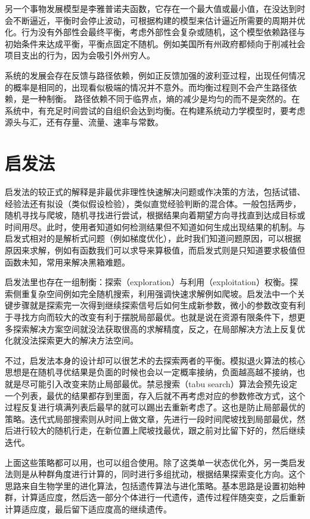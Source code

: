 \documentclass[]{tufte-book}
\begin{document}
另一个事物发展模型是李雅普诺夫函数，它存在一个最大值或最小值，在没达到时会不断逼近，平衡时会停止波动，可根据构建的模型来估计逼近所需要的周期并优化。行为没有外部性会最终平衡，考虑外部性会复杂或随机，这个模型依赖路径与初始条件来达成平衡，平衡点固定不随机。例如美国所有州政府都倾向于削减社会项目支出的行为，因为会吸引外州穷人。

系统的发展会存在反馈与路径依赖，例如正反馈加强的波利亚过程，出现任何情况的概率是相同的，出现看似极端的情况并不意外。而均衡过程则不会产生路径依赖，是一种制衡。 路径依赖不同于临界点，熵的减少是均匀的而不是突然的。在系统中，有充足时间尝试的自组织会达到均衡。在构建系统动力学模型时，要考虑源头与汇，还有存量、流量、速率与常数。

\hypertarget{ux542fux53d1ux6cd5}{%
\section{启发法}\label{ux542fux53d1ux6cd5}}

启发法的较正式的解释是非最优非理性快速解决问题或作决策的方法，包括试错、经验法还有拟设（类似假设检验），类似直觉经验判断的混合体。一般包括两步，随机寻找与爬坡，随机寻找进行尝试，根据结果向着期望方向寻找直到达成目标或时间用尽。此时，使用者知道如何检测结果但不知道如何生成出现结果的机制。与启发式相对的是解析式问题（例如梯度优化），此时我们知道问题原因，可以根据原因来求解，例如有函数我们可以求导来算极值，而启发式则是只知道要求极值但函数未知，常用来解决黑箱难题。

启发法里也存在一组制衡：探索（exploration）与利用（exploitation）权衡。探索侧重复杂空间例如完全随机搜索，利用强调快速求解例如爬坡。启发法中一个关键步骤就是探索完一次得到继续探索信号后如何生成新参数，微小的参数改变有利于寻找方向而较大的改变有利于摆脱局部最优。也就是说在资源有限条件下，想更多探索解决方案空间就没法获取很高的求解精度，反之，在局部解决方法上反复优化就没法探索更大的解决方法空间。

不过，启发法本身的设计却可以很艺术的去探索两者的平衡。模拟退火算法的核心思想是在随机寻优结果是负面的时候也会以一定概率接纳，负面越高越不接纳，也就是尽可能引入改变来防止局部最优。禁忌搜索（tabu search）算法会预先设定一个列表，最优的结果都存到里面，存入后就不再考虑对应的参数修改方式，这个过程反复进行填满列表后最早的就可以踢出去重新考虑了。这也是防止局部最优的策略。迭代式局部搜索则从时间上做文章，先进行一段时间爬坡找到局部最优，然后进行较大的随机行走，在新位置上爬坡找最优，跟之前对比留下好的，然后继续迭代。

上面这些策略都可以用，也可以组合使用。除了这类单一状态优化外，另一类启发法则是从种群角度进行计算的，同时进行多组扰动，根据结果探索变化方向。这个思路来自生物学里的进化算法，包括遗传算法与进化策略。基本思路是设置初始种群，计算适应度，然后选一部分个体进行一代遗传，遗传过程伴随突变，之后重新计算适应度，最后留下适应度高的继续遗传。
\end{document}
